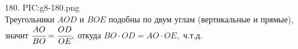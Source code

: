 180. {{PIC:g8-180.png}}\\
Треугольники $AOD$ и $BOE$ подобны по двум углам (вертикальные и прямые), значит $\cfrac{AO}{BO}=\cfrac{OD}{OE},$ откуда $BO\cdot OD=AO\cdot OE,$ ч.т.д.\\
